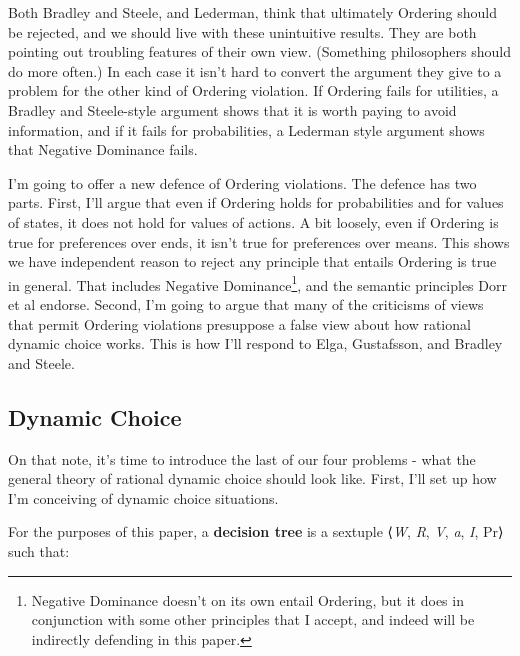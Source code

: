 \documentclass[
  10pt,
  letterpaper,
  DIV=11,
  numbers=noendperiod,
  twoside]{scrartcl}
\begin{document}
Both Bradley and Steele, and Lederman, think that ultimately Ordering
should be rejected, and we should live with these unintuitive results.
They are both pointing out troubling features of their own view.
(Something philosophers should do more often.) In each case it isn't
hard to convert the argument they give to a problem for the other kind
of Ordering violation. If Ordering fails for utilities, a Bradley and
Steele-style argument shows that it is worth paying to avoid
information, and if it fails for probabilities, a Lederman style
argument shows that Negative Dominance fails.

I'm going to offer a new defence of Ordering violations. The defence has
two parts. First, I'll argue that even if Ordering holds for
probabilities and for values of states, it does not hold for values of
actions. A bit loosely, even if Ordering is true for preferences over
ends, it isn't true for preferences over means. This shows we have
independent reason to reject any principle that entails Ordering is true
in general. That includes Negative Dominance\footnote{Negative Dominance
  doesn't on its own entail Ordering, but it does in conjunction with
  some other principles that I accept, and indeed will be indirectly
  defending in this paper.}, and the semantic principles Dorr et al
endorse. Second, I'm going to argue that many of the criticisms of views
that permit Ordering violations presuppose a false view about how
rational dynamic choice works. This is how I'll respond to Elga,
Gustafsson, and Bradley and Steele.

\subsection{Dynamic Choice}\label{sec-dynamic-choice}

On that note, it's time to introduce the last of our four problems -
what the general theory of rational dynamic choice should look like.
First, I'll set up how I'm conceiving of dynamic choice situations.

For the purposes of this paper, a \textbf{decision tree} is a sextuple
⟨\emph{W}, \emph{R}, \emph{V}, \emph{a}, \emph{I}, Pr⟩ such that:
\end{document}

